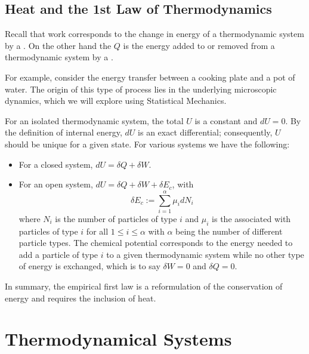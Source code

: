 \documentclass[12pt, a4paper, oneside, openright, titlepage]{book}
\begin{document}
\section{Heat and the 1st Law of Thermodynamics}

\begin{defn}
    Recall that work corresponds to the change in energy of a thermodynamic system by a . On the other hand the  $Q$ is the energy added to or removed from a thermodynamic system by a .
\end{defn}

For example, consider the energy transfer between a cooking plate and a pot of water. The origin of this type of process lies in the underlying microscopic dynamics, which we will explore using Statistical Mechanics.

\begin{law}
    For an isolated thermodynamic system, the total  $U$ is a constant and $dU = 0$. By the definition of internal energy, $dU$ is an exact differential; consequently, $U$ should be unique for a given state. For various systems we have the following: \begin{itemize}
        \item For a closed system, $dU = \delta Q + \delta W$. 
        \item For an open system, $dU = \delta Q + \delta W + \delta E_c$, with $$\delta E_c := \sum_{i=1}^{\alpha}\mu_idN_i$$ where $N_i$ is the number of particles of type $i$ and $\mu_i$ is the  associated with particles of type $i$ for all $1 \leq i \leq \alpha$ with $\alpha$ being the number of different particle types. The chemical potential corresponds to the energy needed to add a particle of type $i$ to a given thermodynamic system while no other type of energy is exchanged, which is to say $\delta W = 0$ and $\delta Q = 0$.
    \end{itemize}
\end{law}

In summary, the empirical first law is a reformulation of the conservation of energy and requires the inclusion of heat. 



\chapter{Thermodynamical Systems}
\end{document}
